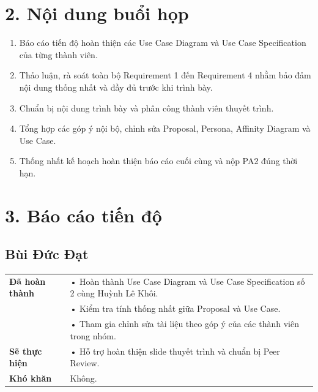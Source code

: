 \documentclass[11pt,a4paper]{article}
\begin{document}
\vspace{0.8cm}


\section*{2. Nội dung buổi họp}

\begin{enumerate}
    \item Báo cáo tiến độ hoàn thiện các Use Case Diagram và Use Case Specification của từng thành viên.

    \item Thảo luận, rà soát toàn bộ Requirement 1 đến Requirement 4 nhằm bảo đảm nội dung thống nhất và đầy đủ trước khi trình bày.

    \item Chuẩn bị nội dung trình bày và phân công thành viên thuyết trình.

    \item Tổng hợp các góp ý nội bộ, chỉnh sửa Proposal, Persona, Affinity Diagram và Use Case.

    \item Thống nhất kế hoạch hoàn thiện báo cáo cuối cùng và nộp PA2 đúng thời hạn.
\end{enumerate}


\section*{3. Báo cáo tiến độ}


\subsection*{Bùi Đức Đạt}

\begin{tabularx}{\textwidth}{|p{4cm}|X|}
\hline
\textbf{Đã hoàn thành} &
• Hoàn thành Use Case Diagram và Use Case Specification số 2 cùng Huỳnh Lê Khôi.\\
&
• Kiểm tra tính thống nhất giữa Proposal và Use Case.\\
&
• Tham gia chỉnh sửa tài liệu theo góp ý của các thành viên trong nhóm.\\
\hline

\textbf{Sẽ thực hiện} &
• Hỗ trợ hoàn thiện slide thuyết trình và chuẩn bị Peer Review.\\
\hline

\textbf{Khó khăn} &
Không.\\
\hline
\end{tabularx}
\end{document}
